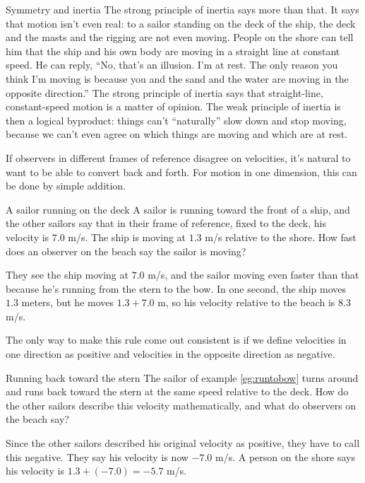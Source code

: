 \begin{envsubsection}{Symmetry and inertia}
The strong principle of inertia says more than that. It says that motion isn't even real:
to a sailor standing on the deck of the ship, the deck and the masts and the rigging are not even
moving. People on the shore can tell him that the ship and his own body are moving in a straight
line at constant speed. He can reply, ``No, that's an illusion. I'm at rest. The only reason you think I'm moving is
because you and the sand and the water are moving in the opposite direction.''
The strong principle of inertia says that straight-line, constant-speed motion is a matter of opinion.
The weak principle of inertia is then a logical
byproduct: things can't ``naturally'' slow down and stop moving, because we can't even agree on which things
are moving and which are at rest.

If observers in different frames of reference disagree on velocities, it's natural to
want to be able to convert back and forth. For motion in one dimension, this can be
done by simple addition.

\begin{eg}{A sailor running on the deck}\label{eg:runtobow}
\egquestion
A sailor is running toward the front of a ship, and the other sailors say that in
their frame of reference, fixed to the deck, his velocity is $7.0$ m/s. The ship
is moving at $1.3$ m/s relative to the shore. How fast does an observer on the beach
say the sailor is moving?

\eganswer
They see the ship moving at $7.0$ m/s, and the sailor moving even faster than that because
he's running from the stern to the bow. In one second, the ship moves $1.3$ meters,
but he moves $1.3+7.0$ m, so his velocity relative to the beach is $8.3$ m/s. 
\end{eg}

The only way to make this rule come out consistent is if we define velocities in
one direction as positive and velocities in the opposite direction as negative.

\begin{eg}{Running back toward the stern}
\egquestion
The sailor of example \ref{eg:runtobow} turns around and runs back toward the stern
at the same speed relative to the deck. How do the other sailors describe this
velocity mathematically, and what do observers on the beach say?

\eganswer
Since the other sailors described his original velocity as positive, they have to call
this negative. They say his velocity is now $-7.0$ m/s. A person on the shore says
his velocity is $1.3+(-7.0)=-5.7$ m/s.
\end{eg}

\end{envsubsection}
